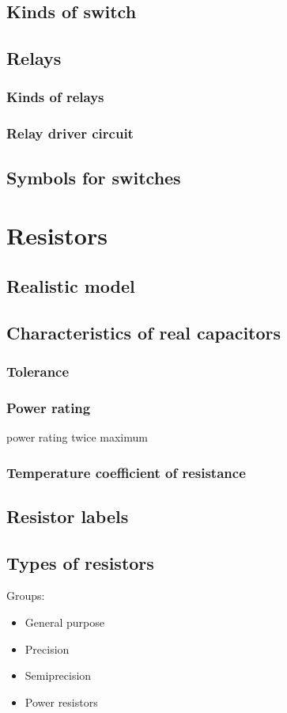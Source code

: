 \documentclass{report}
\begin{document}
\subsection{Kinds of switch}
\subsection{Relays}
\subsubsection{Kinds of relays}
\subsubsection{Relay driver circuit}
\subsection{Symbols for switches}
\section{Resistors}
\subsection{Realistic model}
\subsection{Characteristics of real capacitors}
\subsubsection{Tolerance}
\subsubsection{Power rating}
power rating twice maximum
\subsubsection{Temperature coefficient of resistance}
\subsection{Resistor labels}
\subsection{Types of resistors}
Groups:
\begin{itemize}
\item General purpose
\item Precision
\item Semiprecision
\item Power resistors
\end{itemize}
\end{document}
